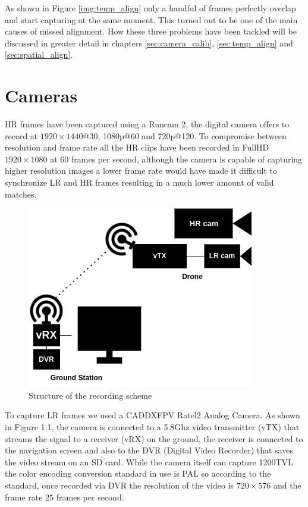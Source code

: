 As shown in Figure \ref{img:temp_align} only a handful of frames perfectly overlap and start capturing at the same moment. This turned out to be one of the main causes of missed alignment.
How these three problems have been tackled will be discussed in greater detail in chapters \ref{sec:camera_calib}, \ref{sec:temp_align} and \ref{sec:spatial_align}.

\section{Cameras}
\label{sec:cameras}

HR frames have been captured using a Runcam 2\cite{runcam}, the digital camera offers to record at \(1920\times1440\)@30, 1080p@60 and 720p@120. To compromise between resolution and frame rate all the HR clips have been recorded in FullHD  \(1920\times1080\) at 60 frames per second, although the camera is capable of capturing higher resolution images a lower frame rate would have made it difficult to synchronize LR and HR frames resulting in a much lower amount of valid matches.
\begin{figure}[h]
  \centering
  \includegraphics[scale=0.5]{figures/recording_schematics_2.png}
  \caption{Structure of the recording scheme}
\end{figure}
To capture LR frames we used a CADDXFPV Ratel2 Analog Camera\cite{caddx}. As shown in Figure 1.1, the camera is connected to a 5.8Ghz video transmitter (vTX) that streams the signal to a receiver (vRX) on the ground, the receiver is connected to the navigation screen and also to the DVR (Digital Video Recorder) that saves the video stream on an SD card. While the camera itself can capture 1200TVL the color encoding conversion standard in use is PAL\cite{pal} so according to the standard, once recorded via DVR the resolution of the video is  \(720\times576\) and the frame rate 25 frames per second.

